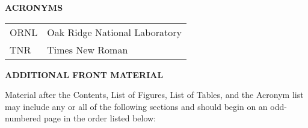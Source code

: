 \documentclass[11pt,letterpaper,twoside,english,final]{article}
\begin{document}

\newpage

\clearemptydoublepage
{} 
\begin{centering}
\listoftables 
\end{centering}


\newpage

\clearemptydoublepage
{}
{} 
\begin{center}
{\bf{ACRONYMS}}
\end{center}

\begin{table}[h]
\vspace{-6pt}
\begin{tabular}{l l} 
ORNL & Oak Ridge National Laboratory \\
TNR & Times New Roman  \\
\end{tabular}
\end{table}


\newpage

\clearemptydoublepage
{}
{}
\begin{center}
{\bf{ADDITIONAL FRONT MATERIAL}}
\end{center}

Material after the Contents, List of Figures, List of Tables, and the Acronym list may include any or all of the following sections and should begin on an odd-numbered page in the order listed below:
\end{document}
